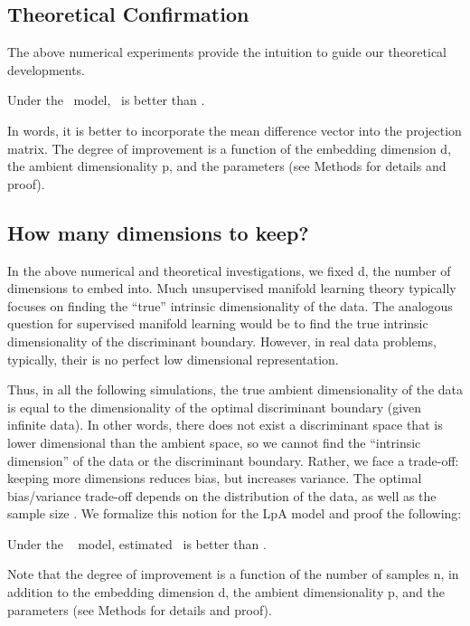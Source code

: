 \documentclass[10pt]{article}
\begin{document}
\subsection*{Theoretical Confirmation}

The above numerical experiments provide the intuition to guide our theoretical developments.  
\begin{thm} \label{thm:LDA}
Under the \Lda~model, \Lol~is better than \Pca.
\end{thm}
In words, it is better to incorporate the mean difference vector into the projection matrix.  The degree of improvement is a function of the embedding dimension d, the ambient dimensionality p, and the parameters (see Methods for details and proof).



\subsection*{How many dimensions to keep?}

In the above numerical and theoretical investigations, we fixed d, the number of dimensions to embed into.  Much unsupervised manifold learning theory typically focuses on finding the ``true'' intrinsic dimensionality of the data.   The analogous question for supervised manifold learning would be to find the true intrinsic dimensionality of the discriminant boundary.  However, in real data problems, typically, their is no perfect low dimensional representation.

Thus, in all the following simulations, the true ambient dimensionality of the data is equal to the dimensionality of the optimal discriminant boundary (given infinite data).  In other words, there does not exist a discriminant space that is lower dimensional than the ambient space, so we cannot find the ``intrinsic dimension'' of the data or the discriminant boundary.  Rather, we face a trade-off: keeping more dimensions reduces bias, but increases variance.  The optimal bias/variance trade-off depends on the distribution of the data, as well as the sample size \cite{Trunk1979a}.  We formalize this notion for the LpA model and proof the following:
\begin{thm} \label{thm:n}
Under the \Lda~ model, estimated \Lol~is better than \Pca.
\end{thm}
Note that the degree of improvement is a function of the number of samples n, in addition to the embedding dimension d, the ambient dimensionality p, and the parameters (see Methods for details and proof).
\end{document}
